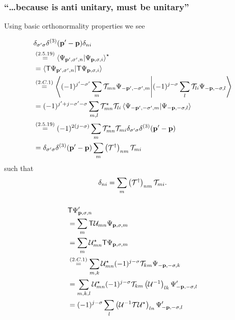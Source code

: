 \subsubsection{\enquote{\dots because \timereversal is anti unitary, \timereversalmatrix must be unitary} }
Using basic orthonormality properties we see

\begin{align*}
	&\delta_{\sigma^\prime \sigma} \delta^{(3)}(\tvec{p}^\prime-\tvec{p})\delta_{ni}\\
	&\overset{\eqc{2.5.19}}{=}\innerproduct{\Psi_{\tvec{p}^\prime,\sigma^\prime,n}}{\Psi_{\tvec{p},\sigma,i}}^\star\\
	&=\innerproduct{\timereversal \Psi_{\tvec{p}^\prime,\sigma^\prime,n}}{\timereversal\Psi_{\tvec{p},\sigma,i}}\\
	&\overset{\eqc{2.C.1}}{=}\innerproduct{(-1)^{j^\prime-\sigma^\prime}\sum\limits_{m}\timereversalmatrix_{mn}\Psi_{-\tvec{p}^\prime,-\sigma^\prime,m}}{(-1)^{j-\sigma}\sum\limits_{l}\timereversalmatrix_{li}\Psi_{-\tvec{p},-\sigma,l}}\\
	&=(-1)^{j^\prime+j-\sigma^\prime-\sigma}\sum\limits_{m,l}\timereversalmatrix_{mn}^\star\timereversalmatrix_{li}\innerproduct{\Psi_{-\tvec{p}^\prime,-\sigma^\prime,m}}{\Psi_{-\tvec{p},-\sigma,l}}\\
	&\overset{\eqc{2.5.19}}{=}(-1)^{2(j-\sigma)}\sum\limits_{m}\timereversalmatrix_{mn}^\star\timereversalmatrix_{mi}\delta_{\sigma^\prime \sigma} \delta^{(3)}(\tvec{p}^\prime-\tvec{p})\\
	&=\delta_{\sigma^\prime \sigma} \delta^{(3)}(\tvec{p}^\prime-\tvec{p})
	\sum\limits_{m}\left(\timereversalmatrix^\dagger\right)_{nm}\timereversalmatrix_{mi}
\end{align*}
such that
\[\delta_{ni}=\sum\limits_{m}\left(\mathcal{T}^\dagger\right)_{nm}\mathcal{T}_{mi}.\]

\subsubsection{ }
\begin{align*}
	&\mathsf{T} \Psi_{\mathbf{p},\sigma,n}^\prime\\
	&=\sum\limits_{m}\mathsf{T}\mathcal{U}_{mn}\Psi_{\mathbf{p},\sigma,m}\\
	&=\sum\limits_{m}\mathcal{U}_{mn}^\star\mathsf{T}\Psi_{\mathbf{p},\sigma,m}\\
	&\overset{({2.C.1})}{=}\sum\limits_{m,k}\mathcal{U}_{mn}^\star(-1)^{j-\sigma}\mathcal{T}_{km}\Psi_{-\mathbf{p},-\sigma,k}\\
	&=\sum\limits_{m,k,l}\mathcal{U}_{mn}^\star(-1)^{j-\sigma}\mathcal{T}_{km}\left(\mathcal{U}^{-1}\right)_{lk}\Psi_{-\mathbf{p},-\sigma,l}^\prime\\
	&=(-1)^{j-\sigma}\sum\limits_{l}\left(\mathcal{U}^{-1}\mathcal{T} \mathcal{U}^\star\right)_{ln}\Psi_{-\mathbf{p},-\sigma,l}^\prime
\end{align*}

